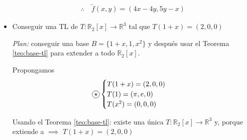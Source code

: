 \begin{itemize}
\begin{gather*}
    \therefore \quad \tilde{f}(x,y) = \left(4x-4y, 5y - x\right)
\end{gather*}

\item Conseguir una TL de $T: \mathbb{R}_2[x] \to \mathbb{R}^3$ tal que
    $T(1+x) = (2,0,0)$

    \medskip

    \textit{Plan:} conseguir una base $B = \{ 1+x, 1, x^2 \}$
    y después usar el Teorema \ref{teo:base-tl} para extender a todo 
    $\mathbb{R}_2[x]$.

    Propongamos
    \begin{gather*}
        \circled{$\star$}
        \begin{cases}
            T(1+x) = (2,0,0) \\
            T(1) = (\pi, e, 0) \\
            T(x^2) = (0,0,0)
        \end{cases}
    \end{gather*}

    Usando el Teorema \ref{teo:base-tl}: existe una única
    $T: \mathbb{R}_2[x] \to \mathbb{R}^3$
    y, porque extiende a \circled{$\star$} $\implies$
    $T(1+x) = (2,0,0)$
\end{itemize}
